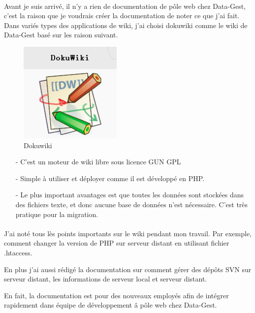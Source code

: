 \paragraph{}
Avant je suis arrivé, il n'y a rien de documentation de pôle web chez Data-Gest, c'est la raison que je voudrais créer la documentation de noter ce que j'ai fait. Dans variés types des applications de wiki, j'ai choisi dokuwiki comme le wiki de Data-Gest basé sur les raison suivant.
\begin{figure}[hbtp]
\centering
\includegraphics[width=5cm]{body/images/dukowiki.png}
\caption{Dokuwiki}
\end{figure}
\begin{itemize}
\item [-] C'est un moteur de wiki libre sous licence GUN GPL
\item [-] Simple à utiliser et déployer comme il est développé en PHP.
\item [-] Le plus important avantages est que toutes les données sont stockées dans des fichiers texte, et donc aucune base de données n’est nécessaire. C'est très pratique pour la migration.
\end{itemize}

\paragraph{}
J'ai noté tous lès points importants sur le wiki pendant mon travail. Par exemple, comment changer la version de PHP sur serveur distant en utilisant fichier .htaccess. 

En plus j'ai aussi rédigé la documentation sur comment gérer des dépôts SVN sur serveur distant, les informations de serveur local et serveur distant. 

En fait, la documentation est pour des nouveaux employés afin de intégrer rapidement dans équipe de développement â pôle web chez Data-Gest. 

